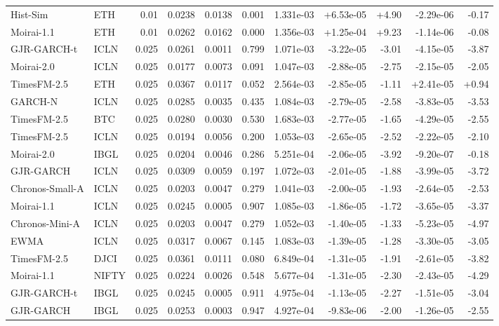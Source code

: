\begin{tabular}{llrrrrrrrrr}
Hist-Sim & ETH & 0.01 & 0.0238 & 0.0138 & 0.001 & 1.331e-03 & +6.53e-05 & +4.90 & -2.29e-06 & -0.17 \\
Moirai-1.1 & ETH & 0.01 & 0.0262 & 0.0162 & 0.000 & 1.356e-03 & +1.25e-04 & +9.23 & -1.14e-06 & -0.08 \\
GJR-GARCH-t & ICLN & 0.025 & 0.0261 & 0.0011 & 0.799 & 1.071e-03 & -3.22e-05 & -3.01 & -4.15e-05 & -3.87 \\
Moirai-2.0 & ICLN & 0.025 & 0.0177 & 0.0073 & 0.091 & 1.047e-03 & -2.88e-05 & -2.75 & -2.15e-05 & -2.05 \\
TimesFM-2.5 & ETH & 0.025 & 0.0367 & 0.0117 & 0.052 & 2.564e-03 & -2.85e-05 & -1.11 & +2.41e-05 & +0.94 \\
GARCH-N & ICLN & 0.025 & 0.0285 & 0.0035 & 0.435 & 1.084e-03 & -2.79e-05 & -2.58 & -3.83e-05 & -3.53 \\
TimesFM-2.5 & BTC & 0.025 & 0.0280 & 0.0030 & 0.530 & 1.683e-03 & -2.77e-05 & -1.65 & -4.29e-05 & -2.55 \\
TimesFM-2.5 & ICLN & 0.025 & 0.0194 & 0.0056 & 0.200 & 1.053e-03 & -2.65e-05 & -2.52 & -2.22e-05 & -2.10 \\
Moirai-2.0 & IBGL & 0.025 & 0.0204 & 0.0046 & 0.286 & 5.251e-04 & -2.06e-05 & -3.92 & -9.20e-07 & -0.18 \\
GJR-GARCH & ICLN & 0.025 & 0.0309 & 0.0059 & 0.197 & 1.072e-03 & -2.01e-05 & -1.88 & -3.99e-05 & -3.72 \\
Chronos-Small-A & ICLN & 0.025 & 0.0203 & 0.0047 & 0.279 & 1.041e-03 & -2.00e-05 & -1.93 & -2.64e-05 & -2.53 \\
Moirai-1.1 & ICLN & 0.025 & 0.0245 & 0.0005 & 0.907 & 1.085e-03 & -1.86e-05 & -1.72 & -3.65e-05 & -3.37 \\
Chronos-Mini-A & ICLN & 0.025 & 0.0203 & 0.0047 & 0.279 & 1.052e-03 & -1.40e-05 & -1.33 & -5.23e-05 & -4.97 \\
EWMA & ICLN & 0.025 & 0.0317 & 0.0067 & 0.145 & 1.083e-03 & -1.39e-05 & -1.28 & -3.30e-05 & -3.05 \\
TimesFM-2.5 & DJCI & 0.025 & 0.0361 & 0.0111 & 0.080 & 6.849e-04 & -1.31e-05 & -1.91 & -2.61e-05 & -3.82 \\
Moirai-1.1 & NIFTY & 0.025 & 0.0224 & 0.0026 & 0.548 & 5.677e-04 & -1.31e-05 & -2.30 & -2.43e-05 & -4.29 \\
GJR-GARCH-t & IBGL & 0.025 & 0.0245 & 0.0005 & 0.911 & 4.975e-04 & -1.13e-05 & -2.27 & -1.51e-05 & -3.04 \\
GJR-GARCH & IBGL & 0.025 & 0.0253 & 0.0003 & 0.947 & 4.927e-04 & -9.83e-06 & -2.00 & -1.26e-05 & -2.55 \\

\end{tabular}
